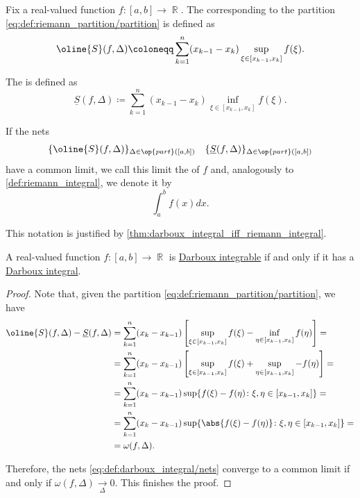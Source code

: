 \begin{definition}\label{def:darboux_integral}
  Fix a real-valued function \( f: [a, b] \to \BbbR \). The  corresponding to the partition \eqref{eq:def:riemann_partition/partition} is defined as
  \begin{equation*}
    \oline{S}(f, \Delta) \coloneqq \sum_{k=1}^n (x_{k-1} - x_k) \sup_{\xi \in [x_{k-1}, x_k]} f(\xi).
  \end{equation*}

  The  is defined as
  \begin{equation*}
    \underline{S}(f, \Delta) \coloneqq \sum_{k=1}^n (x_{k-1} - x_k) \inf_{\xi \in [x_{k-1}, x_k]} f(\xi).
  \end{equation*}

  If the nets
  \begin{align}\label{eq:def:darboux_integral/nets}
    \{ \oline{S}(f, \Delta) \}_{\Delta \in \op{part}([a, b])}
    &&
    \{ \underline{S}(f, \Delta) \}_{\Delta \in \op{part}([a, b])}
  \end{align}
  have a common limit, we call this limit the  of \( f \) and, analogously to \cref{def:riemann_integral}, we denote it by
  \begin{equation*}
    \int_a^b f(x) dx.
  \end{equation*}

  This notation is justified by \cref{thm:darboux_integral_iff_riemann_integral}.
\end{definition}

\begin{proposition}\label{thm:darboux_integrable_iff_has_darboux_integral}
  A real-valued function \( f: [a, b] \to \BbbR \) is \hyperref[def:darboux_integrability]{Darboux integrable} if and only if it has a \hyperref[def:darboux_integral]{Darboux integral}.
\end{proposition}
\begin{proof}
  Note that, given the partition \eqref{eq:def:riemann_partition/partition}, we have
  \begin{align*}
    \oline{S}(f, \Delta) - \underline{S}(f, \Delta)
    &=
    \sum_{k=1}^n (x_k - x_{k-1}) \left[ \sup_{\xi \in [x_{k-1}, x_k]} f(\xi) - \inf_{\eta \in [x_{k-1}, x_k]} f(\eta) \right]
    = \\ &=
    \sum_{k=1}^n (x_k - x_{k-1}) \left[ \sup_{\xi \in [x_{k-1}, x_k]} f(\xi) + \sup_{\eta \in [x_{k-1}, x_k]} -f(\eta) \right]
    = \\ &=
    \sum_{k=1}^n (x_k - x_{k-1}) \sup \{ f(\xi) - f(\eta) \colon \xi, \eta \in [x_{k-1}, x_k] \}
    = \\ &=
    \sum_{k=1}^n (x_k - x_{k-1}) \sup \{ \abs{f(\xi) - f(\eta)} \colon \xi, \eta \in [x_{k-1}, x_k] \}
    = \\ &=
    \omega(f, \Delta).
  \end{align*}

  Therefore, the nets \eqref{eq:def:darboux_integral/nets} converge to a common limit if and only if \( \omega(f, \Delta) \xrightarrow[\Delta]{} 0 \). This finishes the proof.
\end{proof}

